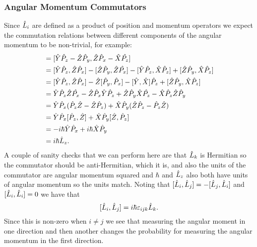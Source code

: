 \subsubsection{Angular Momentum Commutators}
Since \(\hat{L}_i\) are defined as a product of position and momentum operators we expect the commutation relations between different components of the angular momentum to be non-trivial, for example:
\begin{align*}
    [\operator{L}_x, \operator{L}_y] &= [\operator{Y}\operator{P}_z - \operator{Z}\operator{P}_y, \operator{Z}\operator{P}_x - \operator{X}\operator{P_z}]\\
    &= [\operator{Y}\operator{P}_z, \operator{Z}\operator{P}_x] - [\operator{Z}\operator{P}_y, \operator{Z}\operator{P_x}] - [\operator{Y}\operator{P}_z, \operator{X}\operator{P}_z] + [\operator{Z}\operator{P}_y, \operator{X}\operator{P}_z]\\
    &= [\operator{Y}\operator{P}_z, \operator{Z}\operator{P}_x] - \operator{Z}[\operator{P}_y, \operator{P}_x] - [\operator{Y}, \operator{X}]\operator{P}_z + [\operator{Z}\operator{P}_y, \operator{X}\operator{P}_z]\\
    &= \operator{Y}\operator{P}_z\operator{Z}\operator{P_x} - \operator{Z}\operator{P}_x\operator{Y}\operator{P}_z + \operator{Z}\operator{P}_y\operator{X}\operator{P_z} - \operator{X}\operator{P}_z\operator{Z}\operator{P}_y\\
    &= \operator{Y}\operator{P}_x(\operator{P}_z\operator{Z} - \operator{Z}\operator{P}_z) + \operator{X}\operator{P}_y(\operator{Z}\operator{P}_z - \operator{P}_z\operator{Z})\\
    &= \operator{Y}\operator{P}_x[\operator{P}_z, \operator{Z}] + \operator{X}\operator{P}_y[\operator{Z}, \operator{P}_z]\\
    &= -i\hbar\operator{Y}\operator{P}_x + i\hbar\operator{X}\operator{P}_y\\
    &= i\hbar\operator{L}_z.
\end{align*}
A couple of sanity checks that we can perform here are that \(\hat{L}_k\) is Hermitian so the commutator should be anti-Hermitian, which it is, and also the units of the commutator are angular momentum squared and \(\hbar\) and \(\hat{L}_z\) also both have units of angular momentum so the units match.
Noting that \([\hat{L}_i, \hat{L}_j] = -[\hat{L}_j, \hat{L}_i]\) and \([\hat{L}_i, \hat{L}_i] = 0\) we have that
\[[\hat{L}_i, \hat{L}_j] = i\hbar\varepsilon_{ijk}\hat{L}_k.\]
Since this is non-zero when \(i\ne j\) we see that measuring the angular moment in one direction and then another changes the probability for measuring the angular momentum in the first direction.

